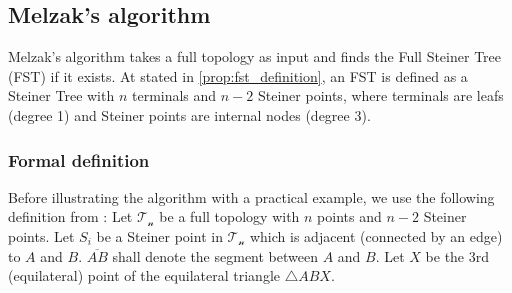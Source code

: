 \documentclass{l4proj}
\begin{document}
\subsection{Melzak's algorithm}
\label{sec:melzak_algo}
Melzak's algorithm takes a full topology as input and finds the Full Steiner Tree (FST) if it exists. At stated in \ref{prop:fst_definition}, an FST is defined as a Steiner Tree with $n$ terminals and $n-2$ Steiner points, where terminals are leafs (degree 1) and Steiner points are internal nodes (degree 3).

\subsubsection{Formal definition}
Before illustrating the algorithm with a practical example, we use the following definition from \citep{Brazil2015}:
Let $\mathcal{T_n}$ be a full topology with $n$ points and $n - 2$ Steiner points. Let $S_i$ be a Steiner point in $\mathcal{T_n}$ which is adjacent (connected by an edge) to $A$ and $B$. $\overline{AB}$ shall denote the segment between $A$ and $B$. Let $X$ be the 3rd (equilateral) point of the equilateral triangle $\triangle ABX$.
\end{document}
